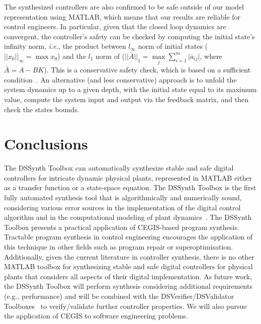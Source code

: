 \documentclass[10pt,conference]{IEEEtran}
\newcommand\tool{{DSSynth Toolbox}\xspace}
\begin{document}
The synthesized controllers are also confirmed to be safe outside of our model
representation using MATLAB, which means that our results are reliable for control engineers. 
In particular, given that the closed loop dynamics are convergent, the controller's safety can be checked by computing the initial state's infinity norm, {\it i.e.}, 
the product between $l_{\infty}$ norm of initial states ($\vert\vert{x_{0}}\vert\vert_{\infty}=\max{x_{0}}$) 
and the $l_{1}$ norm of ($\vert\vert{\bar{A}}\vert\vert_{1}=\max\limits_{j}{\sum\limits_{i=1}^{m} \vert \bar{a}_{ij} \vert}$, 
where $\bar{A}=A-BK$). This is a conservative safety check, which is based on a sufficient condition~\cite{toscano2013structured}. 
An alternative (and less conservative) approach is to unfold the system dynamics up to a given depth, 
with the initial state equal to its maximum value, compute the system input and output via the feedback matrix, 
and then check the states bounds. 


\section{Conclusions}

The \tool can automatically synthesize stable and safe digital controllers
for intricate dynamic physical plants, represented in MATLAB either as a
transfer function or a state-space equation.  The \tool is the first fully
automated synthesis tool that is algorithmically and numerically sound,
considering various error sources in the implementation of the digital
control algorithm and in the computational modeling of plant
dynamics~\cite{abate2017, abatecav2017}.
%
The \tool presents a practical application of CEGIS-based program synthesis.
Tractable program synthesis in control engineering encourages the application
of this technique in other fields such as program repair or superoptimisation.
%
Additionally, given the current literature in controller synthesis, there is
no other MATLAB toolbox for synthesizing stable and safe digital controllers
for physical plants that considers all aspects of their digital
implementation.
%
As future work, the \tool will perform synthesis considering additional
requirements (e.g., performance) and will be combined with the
DSVerifier/DSValidator Toolboxes~\cite{issta2017,dsvalidator} to
verify/validate further controller properties.
We will also pursue the application of CEGIS to software
engineering problems.


 
\end{document}
